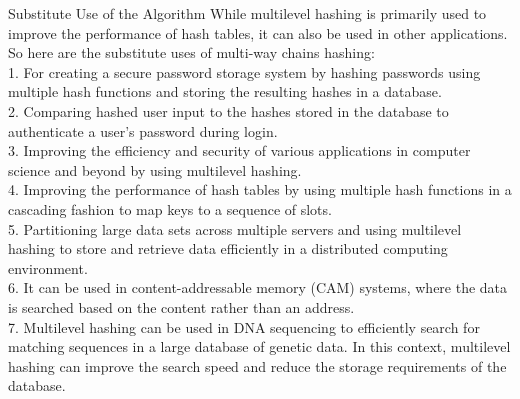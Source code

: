 \documentclass[final]{beamer}
\newlength{\colwidth}
\begin{document}
\begin{frame}[t]
\begin{columns}[t]
\begin{column}{\colwidth}
\begin{alertblock}{Substitute Use of the Algorithm}{}
            While multilevel hashing is primarily used to improve the performance of hash tables, it can also be used in other applications. So here are the substitute uses of multi-way chains hashing:\\
1. For creating a secure password storage system by hashing passwords using multiple hash functions and storing the resulting hashes in a database.\\
2. Comparing hashed user input to the hashes stored in the database to authenticate a user's password during login.\\
3. Improving the efficiency and security of various applications in computer science and beyond by using multilevel hashing.\\
4. Improving the performance of hash tables by using multiple hash functions in a cascading fashion to map keys to a sequence of slots.\\
5. Partitioning large data sets across multiple servers and using multilevel hashing to store and retrieve data efficiently in a distributed computing environment.\\
6. It can be used in content-addressable memory (CAM) systems, where the data is searched based on the content rather than an address.\\
7. Multilevel hashing can be used in DNA sequencing to efficiently search for matching sequences in a large database of genetic data. In this context, multilevel hashing can improve the search speed and reduce the storage requirements of the database.\\

            
			\end{alertblock}
   

\end{column}
\end{columns}
\end{frame}
\end{document}
